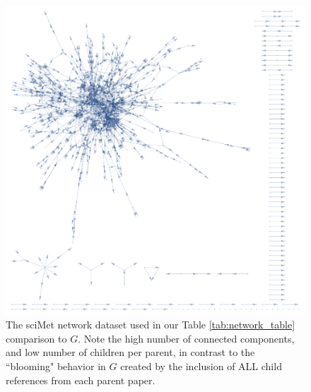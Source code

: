 \documentclass[12pt]{thesis}
\theoremstyle{plain}
\theoremstyle{definition}
\theoremstyle{remark}
\begin{document}
{\begin{figure}[H]
\centering
\includegraphics[width=\textwidth]{display_sciMet.png}
\caption{The sciMet network dataset used in our Table \ref{tab:network_table} comparison to $G$. Note the high number of connected components, and low number of children per parent, in contrast to the ``blooming" behavior in $G$ created by the inclusion of ALL child references from each parent paper.}
\label{fig:sciMet}
\end{figure}

}
\end{document}
